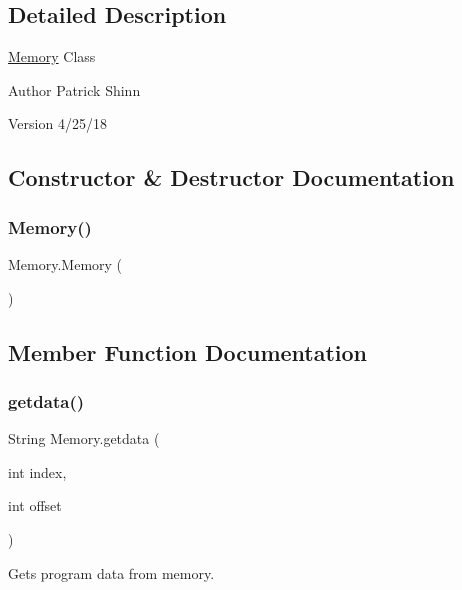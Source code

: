\subsection{Detailed Description}
\mbox{\hyperlink{class_memory}{Memory}} Class

\begin{DoxyAuthor}{Author}
Patrick Shinn 
\end{DoxyAuthor}
\begin{DoxyVersion}{Version}
4/25/18 
\end{DoxyVersion}


\subsection{Constructor \& Destructor Documentation}
\mbox{\label{class_memory_a18ff0d806d11ea959fbb5e6357a1f63e}} 
\subsubsection{\texorpdfstring{Memory()}{Memory()}}
{\footnotesize\ttfamily Memory.\+Memory (\begin{DoxyParamCaption}{ }\end{DoxyParamCaption})\hspace{0.3cm}{\ttfamily [package]}}



\subsection{Member Function Documentation}
\mbox{\label{class_memory_ac543412608c09b39b93b1e30a3b831a2}} 
\subsubsection{\texorpdfstring{getdata()}{getdata()}}
{\footnotesize\ttfamily String Memory.\+getdata (\begin{DoxyParamCaption}\item[{int}]{index,  }\item[{int}]{offset }\end{DoxyParamCaption})\hspace{0.3cm}{\ttfamily [package]}}

Gets program data from memory.


